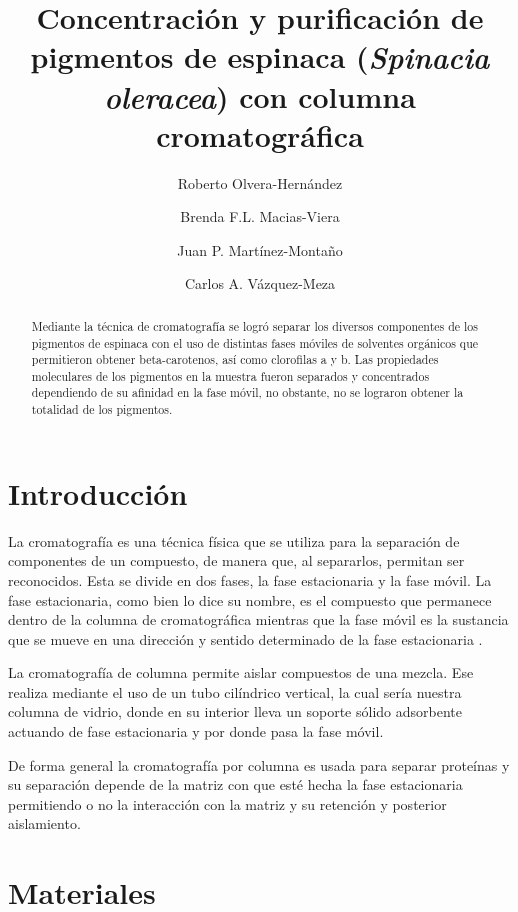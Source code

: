 \documentclass{ITESO-Report}
\title{Concentración y purificación de pigmentos de espinaca (\textit{Spinacia oleracea}) con columna cromatográfica}
\author[a]{Roberto Olvera-Hernández} %
\author[a]{Brenda F.L. Macias-Viera}
\author[a]{Juan P. Martínez-Montaño}
\author[a]{Carlos A. Vázquez-Meza}
\date{} %
\affil[a]{Ingeniería en biotecnología, \itesoinfo}
\begin{document}
\maketitle %
    \nocite{*} %
    {\small \tableofcontents} %
    \thispagestyle{firstpage} %

\begin{abstract}\label{abstract}
    Mediante la técnica de cromatografía se logró separar los diversos componentes de los pigmentos de espinaca con el uso de distintas fases móviles de solventes orgánicos que permitieron obtener beta-carotenos, así como clorofilas a y b. Las propiedades moleculares de los pigmentos en la muestra fueron separados y concentrados dependiendo de su afinidad en la fase móvil, no obstante, no se lograron obtener la totalidad de los pigmentos.
\end{abstract}

\newpage

\section{Introducción}\label{intro}

La cromatografía es una técnica física que se utiliza para la separación de componentes de un compuesto, de manera que, al separarlos, permitan ser reconocidos. Esta se divide en dos fases, la fase estacionaria y la fase móvil. La fase estacionaria, como bien lo dice su nombre, es el compuesto que permanece dentro de la columna de cromatográfica mientras que la fase móvil es la sustancia que se mueve en una dirección y sentido determinado de la fase estacionaria \parencite{Sgariglia2010}. 

La cromatografía de columna permite aislar compuestos de una mezcla. Ese realiza mediante el uso de un tubo cilíndrico vertical, la cual sería nuestra columna de vidrio, donde en su interior lleva un soporte sólido adsorbente actuando de fase estacionaria y por donde pasa la fase móvil.

De forma general la cromatografía por columna es usada para separar proteínas y su separación depende de la matriz con que esté hecha la fase estacionaria permitiendo o no la interacción con la matriz y su retención y posterior aislamiento.

\section{Materiales}\label{materiales}
\end{document}
